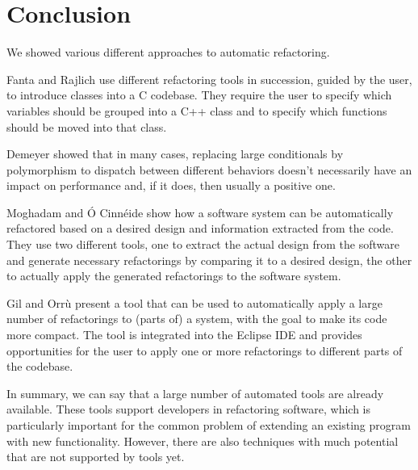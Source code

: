 \documentclass[conference,compsoc,a4paper]{IEEEtran}
\begin{document}
\section{Conclusion}

We showed various different approaches to automatic refactoring.

Fanta and Rajlich \cite{cpp} use different refactoring tools in succession, guided by the user, to introduce classes 
into a C codebase. They require the user to specify which variables should be grouped into a C++ class and to specify 
which functions should be moved into that class.

Demeyer \cite{polymorphism} showed that in many cases, replacing large conditionals by polymorphism to dispatch between 
different behaviors doesn't necessarily have an impact on performance and, if it does, then usually a positive one.

Moghadam and Ó Cinnéide \cite{design-diff} show how a software system can be automatically refactored based on a 
desired design and information extracted from the code. They use two different tools, one to extract the actual design 
from the software and generate necessary refactorings by comparing it to a desired design, the other to actually apply 
the generated refactorings to the software system.

Gil and Orrù \cite{sparta} present a tool that can be used to automatically apply a large number of refactorings to 
(parts of) a system, with the goal to make its code more compact. The tool is integrated into the Eclipse IDE and 
provides opportunities for the user to apply one  or more refactorings to different parts of the codebase.

In summary, we can say that a large number of automated tools are already available. These tools support developers in 
refactoring software, which is particularly important for the common problem of extending an existing program with new 
functionality. However, there are also techniques with much potential that are not supported by tools yet.







\end{document}
